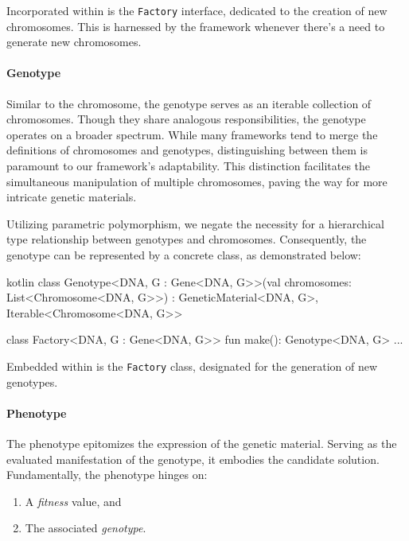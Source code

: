       Incorporated within is the \texttt{Factory} interface, dedicated to 
      the creation of new chromosomes.
      This is harnessed by the framework whenever there's a need to generate 
      new chromosomes.

    \paragraph{Genotype}
      Similar to the chromosome, the genotype serves as an iterable collection 
      of chromosomes.
      Though they share analogous responsibilities, the genotype operates on a 
      broader spectrum.
      While many frameworks tend to merge the definitions of chromosomes and 
      genotypes, distinguishing between them is paramount to our framework's 
      adaptability.
      This distinction facilitates the simultaneous manipulation of multiple 
      chromosomes, paving the way for more intricate genetic materials.
      
      Utilizing parametric polymorphism, we negate the necessity for a 
      hierarchical type relationship between genotypes and chromosomes.
      Consequently, the genotype can be represented by a concrete class, as 
      demonstrated below:
      
      \begin{code}{kotlin}
        class Genotype<DNA, G : Gene<DNA, G>>(val chromosomes: List<Chromosome<DNA, G>>) :
            GeneticMaterial<DNA, G>, Iterable<Chromosome<DNA, G>> {
      
            class Factory<DNA, G : Gene<DNA, G>> {
                fun make(): Genotype<DNA, G> { ... }
            }
        }
      \end{code}
      
      Embedded within is the \texttt{Factory} class, designated for the 
      generation of new genotypes.

    \paragraph{Phenotype}
      The phenotype epitomizes the expression of the genetic material.
      Serving as the evaluated manifestation of the genotype, it embodies the 
      candidate solution.
      Fundamentally, the phenotype hinges on:
      \begin{enumerate}
          \item A \textit{fitness} value, and
          \item The associated \textit{genotype}.
      \end{enumerate}
      

